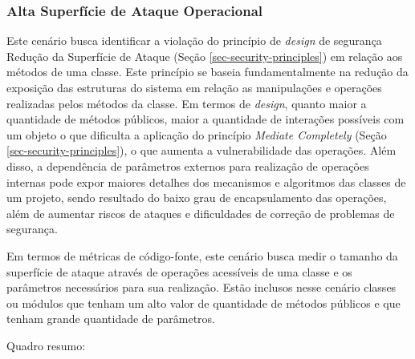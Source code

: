 \subsubsection{Alta Superfície de Ataque Operacional}

Este cenário busca identificar a violação do princípio de \emph{design} de segurança Redução da Superfície de Ataque (Seção \ref{sec-security-principles}) em relação aos métodos de uma classe. Este princípio se baseia fundamentalmente na redução da exposição das estruturas do sistema em relação as manipulações e operações realizadas pelos métodos da classe. Em termos de \emph{design}, quanto maior a quantidade de métodos públicos, maior a quantidade de interações possíveis com um objeto o que dificulta a aplicação do princípio \emph{Mediate Completely} (Seção \ref{sec-security-principles}), o que aumenta a vulnerabilidade das operações. Além disso, a dependência de parâmetros externos para realização de operações internas pode expor maiores detalhes dos mecanismos e algoritmos das classes de um projeto, sendo resultado do baixo grau de encapsulamento das operações, além de aumentar riscos de ataques e dificuldades de correção de problemas de segurança. 

Em termos de métricas de código-fonte, este cenário busca medir o tamanho da superfície de ataque através de operações acessíveis de uma classe e os parâmetros necessários para sua realização. Estão inclusos nesse cenário classes ou módulos que tenham um alto valor de quantidade de métodos públicos e que tenham grande quantidade de parâmetros. 

%

Quadro resumo:

